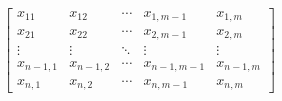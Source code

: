 \documentclass{ctexart}
\begin{document}
$$ \left[\begin{array}{ccccc}x_{11} & x_{12} & \cdots & x_{1, m-1} & x_{1, m} \\ x_{21} & x_{22} & \cdots & x_{2, m-1} & x_{2, m} \\ \vdots & \vdots & \ddots & \vdots & \vdots \\ x_{n-1,1} & x_{n-1,2} & \cdots & x_{n-1, m-1} & x_{n-1, m} \\ x_{n, 1} & x_{n, 2} & \cdots & x_{n, m-1} & x_{n, m}\end{array}\right] $$
\end{document}
